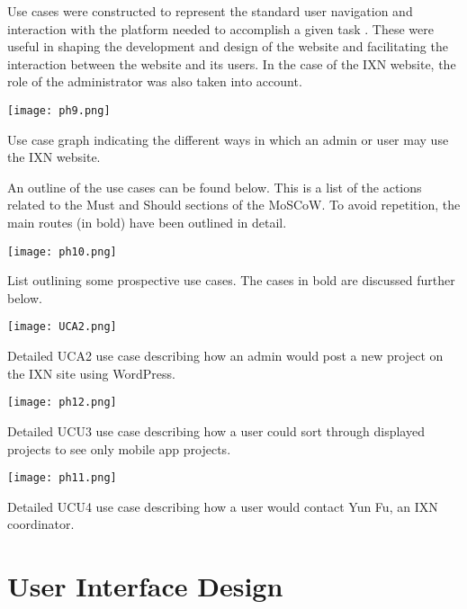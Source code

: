 \documentclass[fontsize=11pt]{extarticle}
\numberwithin{figure}{section} %
\numberwithin{table}{section}%
\begin{document}
Use cases were constructed to represent the standard user navigation and
interaction with the platform needed to accomplish a given task
\cite{g3}. These were useful in shaping the development and design of
the website and facilitating the interaction between the website and its
users. In the case of the IXN website, the role of the administrator was
also taken into account.

\begin{table}[H]
      \centering
      \texttt{[image: ph9.png]}
      \caption{Use case graph indicating the different ways in which an admin or user may use the IXN website.}
\end{table}

An outline of the use cases can be found below. This is a list of the
actions related to the Must and Should sections of the MoSCoW. To avoid
repetition, the main routes (in bold) have been outlined in detail.

\begin{table}[H]
      \centering
      \texttt{[image: ph10.png]}
      \caption{List outlining some prospective use cases. The cases in bold are discussed further below.}
 \end{table}

\begin{table}[H]
      \centering
      \texttt{[image: UCA2.png]}
      \caption{Detailed UCA2 use case describing how an admin would post a new project on the IXN site using WordPress.}
 \end{table}

\begin{table}[H]
      \centering
      \texttt{[image: ph12.png]}
      \caption{Detailed UCU3 use case describing how a user could sort through displayed projects to see only mobile app projects.}
 \end{table}

\begin{table}[H]
      \centering
      \texttt{[image: ph11.png]}
      \caption{Detailed UCU4 use case describing how a user would contact Yun Fu, an IXN coordinator. }
 \end{table}

\newpage

\hypertarget{user-interface-design}{%
\section{User Interface Design}\label{user-interface-design}}
\end{document}
